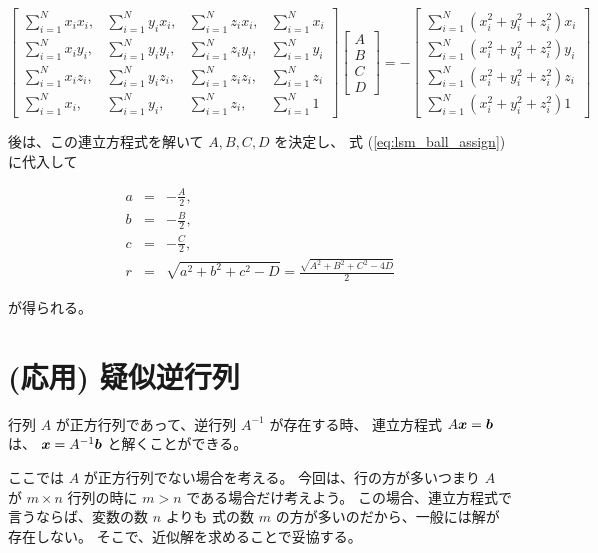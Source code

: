 \documentclass[12pt]{jsarticle}
\def\sumdata{\sum_{i=1}^{N}}
\begin{document}
\begin{equation}
  \begin{bmatrix}
    \sumdata x_i x_i, & \sumdata y_i x_i, & \sumdata z_i x_i, & \sumdata x_i \\
    \sumdata x_i y_i, & \sumdata y_i y_i, & \sumdata z_i y_i, & \sumdata y_i \\
    \sumdata x_i z_i, & \sumdata y_i z_i, & \sumdata z_i z_i, & \sumdata z_i \\
    \sumdata x_i,     & \sumdata y_i,     & \sumdata z_i,     & \sumdata 1
  \end{bmatrix}
  \begin{bmatrix}
    A \\ B \\ C \\ D
  \end{bmatrix}
  = -
  \begin{bmatrix}
    \sumdata \left( x_i^2 + y_i^2 + z_i^2 \right) x_i \\
    \sumdata \left( x_i^2 + y_i^2 + z_i^2 \right) y_i \\
    \sumdata \left( x_i^2 + y_i^2 + z_i^2 \right) z_i \\
    \sumdata \left( x_i^2 + y_i^2 + z_i^2 \right) 1
  \end{bmatrix}
\end{equation}

後は、この連立方程式を解いて $A, B, C, D$ を決定し、
式 (\ref{eq:lsm_ball_assign}) に代入して

\begin{eqnarray}
  a &=& - \frac{A}{2}, \\
  b &=& - \frac{B}{2}, \\
  c &=& - \frac{C}{2}, \\
  r &=& \sqrt{a^2 + b^2 + c^2- D} = \frac{\sqrt{A^2 + B^2 + C^2 - 4D}}{2}
\end{eqnarray}

が得られる。

\section{(応用) 疑似逆行列}

行列 $A$ が正方行列であって、逆行列 $A^{-1}$ が存在する時、
連立方程式 $A \bm{x} = \bm{b}$ は、
$\bm{x} = A^{-1} \bm{b}$
と解くことができる。

ここでは $A$ が正方行列でない場合を考える。
今回は、行の方が多いつまり $A$ が $m \times n$ 行列の時に
$m > n$ である場合だけ考えよう。
この場合、連立方程式で言うならば、変数の数 $n$ よりも
式の数 $m$ の方が多いのだから、一般には解が存在しない。
そこで、近似解を求めることで妥協する。
\end{document}
